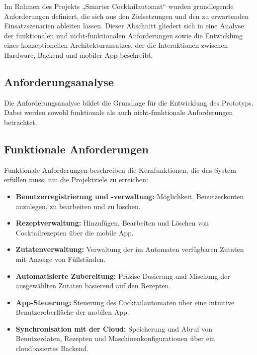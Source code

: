 Im Rahmen des Projekts „Smarter Cocktailautomat“ wurden grundlegende Anforderungen definiert, die sich aus den Zielsetzungen und den zu erwartenden Einsatzszenarien ableiten lassen. Dieser Abschnitt gliedert sich in eine Analyse der funktionalen und nicht-funktionalen Anforderungen sowie die Entwicklung eines konzeptionellen Architekturansatzes, der die Interaktionen zwischen Hardware, Backend und mobiler App beschreibt.

\subsection{Anforderungsanalyse}

Die Anforderungsanalyse bildet die Grundlage für die Entwicklung des Prototyps. Dabei werden sowohl funktionale als auch nicht-funktionale Anforderungen betrachtet.

\subsection{Funktionale Anforderungen}

Funktionale Anforderungen beschreiben die Kernfunktionen, die das System erfüllen muss, um die Projektziele zu erreichen:
\begin{itemize}
	  \item \textbf{\textcolor{red7}{Benutzerregistrierung und -verwaltung:}} Möglichkeit, Benutzerkonten anzulegen, zu bearbeiten und zu löschen.
	  \item \textbf{\textcolor{red7}{Rezeptverwaltung:}} Hinzufügen, Bearbeiten und Löschen von Cocktailrezepten über die mobile App.
	  \item \textbf{\textcolor{red7}{Zutatenverwaltung:}} Verwaltung der im Automaten verfügbaren Zutaten mit Anzeige von Füllständen.
	  \item \textbf{\textcolor{red7}{Automatisierte Zubereitung:}} Präzise Dosierung und Mischung der ausgewählten Zutaten basierend auf den Rezepten.
	  \item \textbf{\textcolor{red7}{App-Steuerung:}} Steuerung des Cocktailautomaten über eine intuitive Benutzeroberfläche der mobilen App.
	  \item \textbf{\textcolor{red7}{Synchronisation mit der Cloud:}} Speicherung und Abruf von Benutzerdaten, Rezepten und Maschinenkonfigurationen über ein cloudbasiertes Backend.
\end{itemize}

